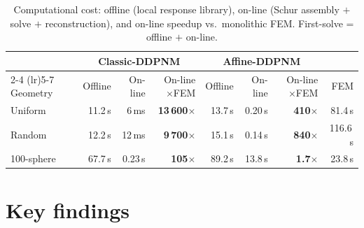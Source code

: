 \documentclass[11pt,a4paper]{article}
\begin{document}
\begin{table}[htbp]
  \centering
  \caption{Computational cost: offline (local response library),
    on-line (Schur assembly $+$ solve $+$ reconstruction), and on-line speedup
    vs.\ monolithic FEM.  First-solve = offline $+$ on-line.}
  \label{tab:cost}
  \small
  \begin{tabular}{@{}lrrrrrrr@{}}
    \toprule
    & \multicolumn{3}{c}{\textbf{Classic-DDPNM}} & \multicolumn{3}{c}{\textbf{Affine-DDPNM}} & \\
    \cmidrule(lr){2-4} \cmidrule(lr){5-7}
    Geometry & Offline & On-line & On-line $\times$FEM & Offline & On-line & On-line $\times$FEM & FEM \\
    \midrule
    Uniform    & 11.2\,s & 6\,ms   & \textbf{13\,600}$\times$ & 13.7\,s & 0.20\,s  & \textbf{410}$\times$ & 81.4\,s \\
    Random     & 12.2\,s & 12\,ms  & \textbf{9\,700}$\times$ & 15.1\,s & 0.14\,s  & \textbf{840}$\times$ & 116.6\,s \\
    100-sphere & 67.7\,s & 0.23\,s & \textbf{105}$\times$   & 89.2\,s & 13.8\,s  & \textbf{1.7}$\times$  & 23.8\,s \\
    \bottomrule
  \end{tabular}
\end{table}

\section{Key findings}
\end{document}
